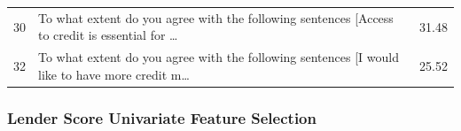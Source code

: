 \begin{longtable}[]{@{}lll@{}}
\begin{minipage}[t]{0.05\columnwidth}
30\strut
\end{minipage} & \begin{minipage}[t]{0.77\columnwidth}\raggedright
To what extent do you agree with the following sentences {[}Access to
credit is essential for \ldots{}\strut
\end{minipage} & \begin{minipage}[t]{0.09\columnwidth}\raggedright
31.48\strut
\end{minipage}\tabularnewline
\begin{minipage}[t]{0.05\columnwidth}\raggedright
32\strut
\end{minipage} & \begin{minipage}[t]{0.77\columnwidth}\raggedright
To what extent do you agree with the following sentences {[}I would like
to have more credit m\ldots{}\strut
\end{minipage} & \begin{minipage}[t]{0.09\columnwidth}\raggedright
25.52\strut
\end{minipage}\tabularnewline
\bottomrule
\end{longtable}

\hypertarget{lender-score-univariate-feature-selection}{%
\subsubsection{Lender Score Univariate Feature
Selection}\label{lender-score-univariate-feature-selection}}

